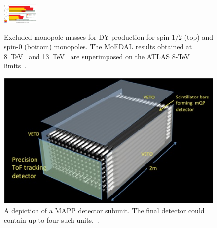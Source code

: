 \begin{figure}[htb]
\begin{minipage}[b]{0.5\textwidth}
\includegraphics[width=\textwidth]{plots/exclusion3}
\caption{\label{fg:limits} Excluded monopole masses for DY production for spin-$1/2$ (top) and spin-$0$ (bottom) monopoles. The MoEDAL results obtained at 8~TeV~\cite{MoEDAL:2016jlb} and 13~TeV~\cite{Acharya:2016ukt} are superimposed on the ATLAS 8-TeV limits~\cite{Aad:2015kta}.}
\end{minipage}\hspace{0.05\textwidth}%
\begin{minipage}[b]{0.45\textwidth}
\includegraphics[width=\textwidth]{plots/mapp.jpg}
\caption{A depiction of a MAPP detector subunit. The final detector could contain up to four such units.~\cite{Pinfold:2017dot}.}
\label{fg:mapp}
\end{minipage} 
\end{figure}

